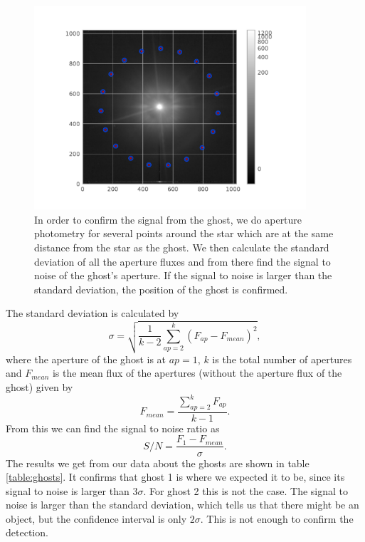 \begin{figure}[H]
	\centering
		\includegraphics[width=0.9\textwidth]{pics/aperture_photometry_19_ghost1.pdf}
		\caption{In order to confirm the signal from the ghost, we do aperture photometry for several points around the star which are at the same distance from the star as the ghost. We then calculate the standard deviation of all the aperture fluxes and from there find the signal to noise of the ghost's aperture. If the signal to noise is larger than the standard deviation, the position of the ghost is confirmed.}
		\label{fig:ap_phot_gh1}
\end{figure}
The standard deviation is calculated by
\begin{equation}
	\sigma = \sqrt{\frac{1}{k-2} \sum_{ap=2}^{k} (F_{ap} - F_{mean})^2} ,
\end{equation}
where the aperture of the ghost is at $ap=1$, $k$ is the total number of apertures and $F_{mean}$ is the mean flux of the apertures (without the aperture flux of the ghost) given by
\begin{equation}
	F_{mean} = \frac{\sum_{ap=2}^{k} F_{ap}}{k-1} .
\end{equation}
From this we can find the signal to noise ratio as
\begin{equation}
	S/N = \frac{F_1 - F_{mean}}{\sigma} .
\end{equation}
The results we get from our data about the ghosts are shown in table \ref{table:ghosts}. It confirms that ghost 1 is where we expected it to be, since its signal to noise is larger than $3 \sigma$. For ghost 2 this is not the case. The signal to noise is larger than the standard deviation, which tells us that there might be an object, but the confidence interval is only $2 \sigma$. This is not enough to confirm the detection. \\
